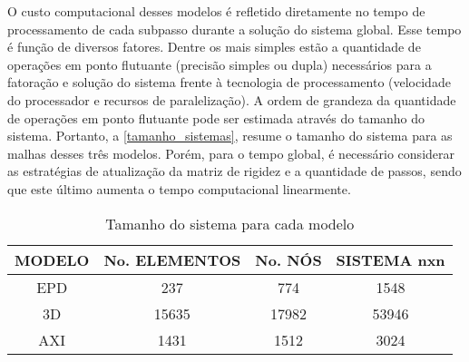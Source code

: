 O custo computacional desses modelos é refletido diretamente no tempo de processamento de cada subpasso durante a solução do sistema global. Esse tempo é função de diversos fatores. Dentre os mais simples estão a quantidade de operações em ponto flutuante (precisão simples ou dupla) necessários para a fatoração e solução do sistema frente à tecnologia de processamento (velocidade do processador e recursos de paralelização). A ordem de grandeza da quantidade de operações em ponto flutuante pode ser estimada através do tamanho do sistema. Portanto, a \autoref{tamanho_sistemas}, resume o tamanho do sistema para as malhas desses três modelos. Porém, para o tempo global, é necessário considerar as estratégias de atualização da matriz de rigidez e a quantidade de passos, sendo que este último aumenta o tempo computacional linearmente.

\begin{table}[H]
	\caption{Tamanho do sistema para cada modelo}
	\label{tamanho_sistemas}
	\centering
	\small
	\renewcommand{\arraystretch}{1.25}
	\begin{tabular}{c c c c}
		\hline
		\multicolumn{1}{c}{\textbf{MODELO}} &
		\multicolumn{1}{c}{\textbf{No. ELEMENTOS}} &
		\multicolumn{1}{c}{\textbf{No. NÓS}} &
		\multicolumn{1}{c}{\textbf{SISTEMA nxn}} \\
		\hline
		EPD & 237 & 774 & 1548 \\
		3D & 15635 & 17982 & 53946 \\
		AXI & 1431 & 1512 & 3024 \\
		\hline
	\end{tabular}
	\normalsize
\end{table}


